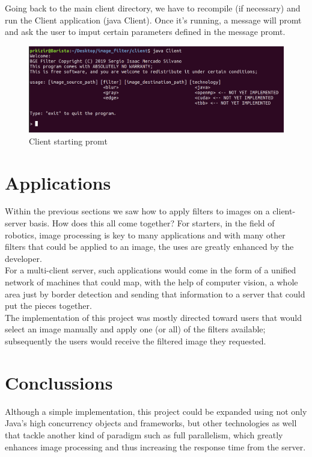 \documentclass[a4paper,12pt]{article}
\begin{document}
	
	Going back to the main client directory, we have to recompile (if necessary) and run the Client application (java Client). Once it's running, a message will promt and ask the user to imput certain parameters defined in the message promt. 
	
	\begin{figure}[h]
		\centering
		\includegraphics[width=\textwidth]{clientinit.png}
		\caption{Client starting promt}
	\end{figure}	
	
		
	
	\section{Applications}

	Within the previous sections we saw how to apply filters to images on a client-server basis. How does this all come together? For starters, in the field of robotics, image processing is key to many applications and with many other filters that could be applied to an image, the uses are greatly enhanced by the developer.\\
	
	For a multi-client server, such applications would come in the form of a unified network of machines that could map, with the help of computer vision, a whole area just by border detection and sending that information to a server that could put the pieces together.\\
	
	The implementation of this project was mostly directed toward users that would select an image manually and apply one (or all) of the filters available; subsequently the users would receive the filtered image they requested.\\

	\section{Conclussions}
	
	Although a simple implementation, this project could be expanded using not only Java's high concurrency objects and frameworks, but other technologies as well that tackle another kind of paradigm such as full parallelism, which greatly enhances image processing and thus increasing the response time from the server.\\
	
\end{document}
